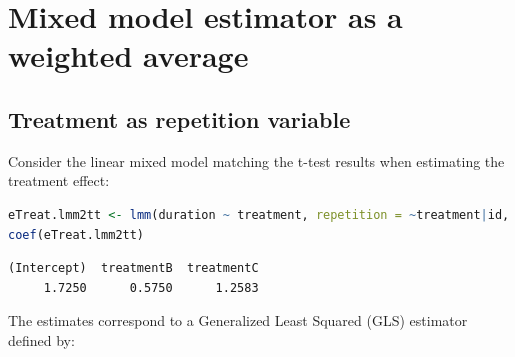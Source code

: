\documentclass[12pt]{article}
\begin{document}
\renewcommand{\thefigure}{\Alph{figure}}
\renewcommand{\thetable}{\Alph{table}}
\renewcommand{\theequation}{\Alph{equation}}

\setcounter{figure}{0}    
\setcounter{table}{0}    
\setcounter{equation}{0}    
\section{Mixed model estimator as a weighted average}
\label{SM:lmm2average}
\subsection{Treatment as repetition variable}
\label{SM:lmm2average1}
Consider the linear mixed model matching the t-test results when
estimating the treatment effect:
\begin{lstlisting}[language=r,numbers=none]
eTreat.lmm2tt <- lmm(duration ~ treatment, repetition = ~treatment|id, data = bloodpressureL)
coef(eTreat.lmm2tt)
\end{lstlisting}

\label{}
\begin{verbatim}
(Intercept)  treatmentB  treatmentC 
     1.7250      0.5750      1.2583
\end{verbatim}


\noindent The estimates correspond to a Generalized Least Squared (GLS)
estimator defined by:

\smallskip
\end{document}
